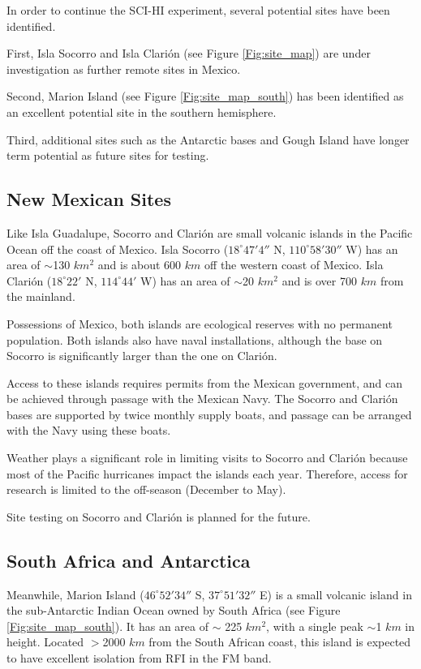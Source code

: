 In order to continue the SCI-HI experiment, several potential sites have been identified.

First, Isla Socorro and Isla Clari\'{o}n (see Figure \ref{Fig:site_map}) are under investigation as further remote sites in Mexico.

Second, Marion Island (see Figure \ref{Fig:site_map_south}) has been identified as an excellent potential site in the southern hemisphere.

Third, additional sites such as the Antarctic bases and Gough Island have longer term potential as future sites for testing. 


\subsection{New Mexican Sites}

Like Isla Guadalupe, Socorro and Clari\'{o}n are small volcanic islands in the Pacific Ocean off the coast of Mexico. Isla Socorro ($18^\circ 47' 4''$ N, $110^\circ 58' 30''$ W) has an area of $\sim$130 $km^2$ and is about 600 $km$ off the western coast of Mexico. Isla Clari\'{o}n ($18^\circ 22'$ N, $114^\circ 44'$ W) has an area of $\sim$20 $km^2$ and is over 700 $km$ from the mainland.

Possessions of Mexico, both islands are ecological reserves with no permanent population. Both islands also have naval installations, although the base on Socorro is significantly larger than the one on Clari\'{o}n. 

Access to these islands requires permits from the Mexican government, and can be achieved through passage with the Mexican Navy. The Socorro and Clari\'{o}n bases are supported by twice monthly supply boats, and passage can be arranged with the Navy using these boats. 

Weather plays a significant role in limiting visits to Socorro and Clari\'{o}n because most of the Pacific hurricanes impact the islands each year. Therefore, access for research is limited to the off-season (December to May). 

Site testing on Socorro and Clari\'{o}n is planned for the future.


\subsection{South Africa and Antarctica}

Meanwhile, Marion Island ($46^\circ 52' 34''$ S, $37^\circ 51' 32''$ E) is a small volcanic island in the sub-Antarctic Indian Ocean owned by South Africa (see Figure \ref{Fig:site_map_south}). It has an area of $\sim$ 225 $km^2$, with a single peak $\sim$1 $km$ in height. Located $>$2000 $km$ from the South African coast, this island is expected to have excellent isolation from RFI in the FM band. 

